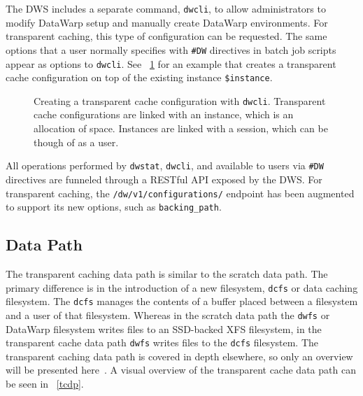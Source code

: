 \documentclass[10pt, conference, compsocconf]{IEEEtran}
\begin{document}
The DWS includes a separate command, \texttt{dwcli}, to allow administrators to modify DataWarp setup and manually create DataWarp environments.  For transparent caching, this type of configuration can be requested.  The same options that a user normally specifies with \texttt{\#DW} directives in batch job scripts appear as options to \texttt{dwcli}.  See \figurename~\ref{dwcli_create_config} for an example that creates a transparent cache configuration on top of the existing instance \texttt{\$instance}.

\begin{figure}
\small
{}
\caption{Creating a transparent cache configuration with \texttt{dwcli}.  Transparent cache configurations are linked with an instance, which is an allocation of space.  Instances are linked with a session, which can be though of as a user.\label{dwcli_create_config}}
\end{figure}

All operations performed by \texttt{dwstat}, \texttt{dwcli}, and available to users via \texttt{\#DW} directives are funneled through a RESTful API exposed by the DWS.  For transparent caching, the \texttt{/dw/v1/configurations/} endpoint has been augmented to support its new options, such as \texttt{backing\_path}.

\subsection{Data Path}

The transparent caching data path is similar to the scratch data path.  The primary difference is in the introduction of a new filesystem, \texttt{dcfs} or data caching filesystem.  The \texttt{dcfs} manages the contents of a buffer placed between a filesystem and a user of that filesystem.  Whereas in the scratch data path the \texttt{dwfs} or DataWarp filesystem writes files to an SSD-backed XFS filesystem, in the transparent cache data path \texttt{dwfs} writes files to the \texttt{dcfs} filesystem.  The transparent caching data path is covered in depth elsewhere, so only an overview will be presented here~\cite{cug_tc_fs}.  A visual overview of the transparent cache data path can be seen in \figurename~\ref{tcdp}.
\end{document}
